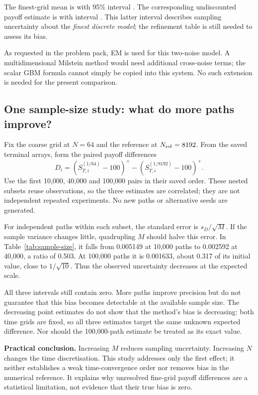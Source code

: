 \documentclass[11pt,a4paper]{article}
\begin{document}
The finest-grid mean is \NAExactMean{} with 95\% interval \NAExactMeanCI{}.
The corresponding undiscounted payoff estimate is \NAPayoff{} with interval \NAPayoffCI{}. This latter interval describes sampling uncertainty about the \emph{finest discrete model}; the refinement table is still needed to assess its bias.

As requested in the problem pack, EM is used for this two-noise model. A multidimensional Milstein method would need additional cross-noise terms; the scalar GBM formula cannot simply be copied into this system. No such extension is needed for the present comparison.

\newpage
\subsection{One sample-size study: what do more paths improve?}\label{sec:sample-size}
Fix the coarse grid at $N=64$ and the reference at $N_{\rm ref}=8192$. From the saved terminal arrays, form the paired payoff differences
\begin{equation}\label{eq:sample-size-difference}
D_i=(S_{T,i}^{(1/64)}-100)^+-(S_{T,i}^{(1/8192)}-100)^+.
\end{equation}
Use the first 10,000, 40,000 and 100,000 pairs in their saved order. These nested subsets reuse observations, so the three estimates are correlated; they are not independent repeated experiments. No new paths or alternative seeds are generated.

For independent paths within each subset, the standard error is $s_D/\sqrt M$. If the sample variance changes little, quadrupling $M$ should halve this error. In Table~\ref{tab:sample-size}, it falls from 0.005149 at 10,000 paths to 0.002592 at 40,000, a ratio of 0.503. At 100,000 paths it is 0.001633, about 0.317 of its initial value, close to $1/\sqrt{10}$. Thus the observed uncertainty decreases at the expected scale.

All three intervals still contain zero. More paths improve precision but do not guarantee that this bias becomes detectable at the available sample size. The decreasing point estimates do not show that the method's bias is decreasing: both time grids are fixed, so all three estimates target the same unknown expected difference. Nor should the 100,000-path estimate be treated as its exact value.

\textbf{Practical conclusion.} Increasing $M$ reduces sampling uncertainty. Increasing $N$ changes the time discretisation. This study addresses only the first effect; it neither establishes a weak time-convergence order nor removes bias in the numerical reference. It explains why unresolved fine-grid payoff differences are a statistical limitation, not evidence that their true bias is zero.
\end{document}
